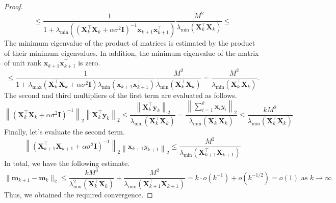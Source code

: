 \documentclass[runningheads]{llncs}
\begin{document}
\begin{proof}
    \[ \leqslant \dfrac{1}{1 + \lambda_{\min}\left(\left( \mathbf{X}_k^{\top} \mathbf{X}_k + \alpha \sigma^2 \mathbf{I} \right)^{-1} \mathbf{x}_{k+1} \mathbf{x}_{k+1}^{\top} \right)} \dfrac{M^2}{\lambda_{\min}\left( \mathbf{X}_k^{\top} \mathbf{X}_k \right)} \leqslant \]
    The minimum eigenvalue of the product of matrices is estimated by the product of their minimum eigenvalues. In addition, the minimum eigenvalue of the matrix of unit rank $\mathbf{x}_{k+1}\mathbf{x}_{k+1}^{\top}$ is zero.
    \[ \leqslant \dfrac{1}{1 + \lambda_{\max}\left( \mathbf{X}_k^{\top} \mathbf{X}_k + \alpha \sigma^2 \mathbf{I} \right) \lambda_{\min}\left( \mathbf{x}_{k+1} \mathbf{x}_{k+1}^{\top} \right)} \dfrac{M^2}{\lambda_{\min}\left( \mathbf{X}_k^{\top} \mathbf{X}_k \right)} = \dfrac{M^2}{\lambda_{\min}\left( \mathbf{X}_k^{\top} \mathbf{X}_k \right)}. \]
The second and third multipliers of the first term are evaluated as follows.
    \[ \left\| \left( \mathbf{X}_k^{\top} \mathbf{X}_k + \alpha \sigma^2 \mathbf{I} \right)^{-1} \right\|_2 \left\| \mathbf{X}_k^{\top} \mathbf{y}_k \right\|_2 \leqslant \dfrac{\left\| \mathbf{X}_k^{\top} \mathbf{y}_k \right\|_2}{\lambda_{\min}\left( \mathbf{X}_k^{\top} \mathbf{X}_k \right)} = \dfrac{\left\| \sum\limits_{i=1}^{k} \mathbf{x}_i y_i \right\|_2}{\lambda_{\min}\left( \mathbf{X}_k^{\top} \mathbf{X}_k \right)} \leqslant \dfrac{k M^2}{\lambda_{\min}\left( \mathbf{X}_k^{\top} \mathbf{X}_k \right)} \]
    Finally, let's evaluate the second term.
    \[ \left\| \left( \mathbf{X}_{k+1}^{\top} \mathbf{X}_{k+1} + \alpha \sigma^2 \mathbf{I} \right)^{-1} \right\|_2 \left\| \mathbf{x}_{k+1} y_{k+1} \right\|_2 \leqslant \dfrac{M^2}{\lambda_{\min}\left( \mathbf{X}_{k+1}^{\top} \mathbf{X}_{k+1} \right)} \]
    In total, we have the following estimate.
    \[ \| \mathbf{m}_{k+1} - \mathbf{m}_k \|_2 \leqslant \dfrac{k M^3}{\lambda_{\min}^2\left( \mathbf{X}_k^{\top} \mathbf{X}_k \right)} + \dfrac{M^2}{\lambda_{\min}\left( \mathbf{X}_{k+1}^{\top} \mathbf{X}_{k+1} \right)} = k\cdot o(k^{-1}) + o(k^{-1/2}) = o(1) \text{ as } k\to \infty\]
    Thus, we obtained the required convergence.
\end{proof}
\end{document}
